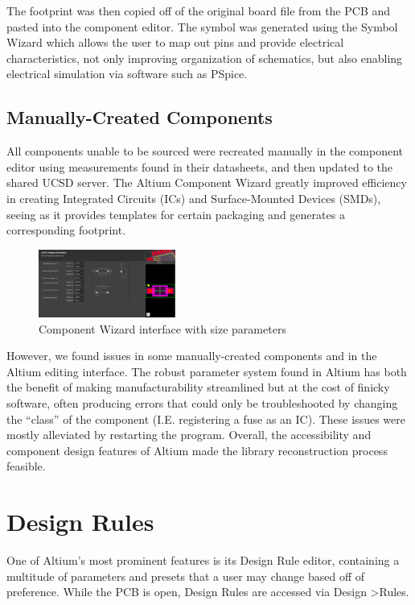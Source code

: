 \documentclass[twocolumn]{article}
\begin{document}
The footprint was then copied off of the original board file from the PCB and pasted into the component editor. The symbol was generated using the Symbol Wizard which allows the user to map out pins and provide electrical characteristics, not only improving organization of schematics, but also enabling electrical simulation via software such as PSpice.

\subsection{Manually-Created Components}
All components unable to be sourced were recreated manually in the component editor using measurements found in their datasheets, and then updated to the shared UCSD server. The Altium Component Wizard greatly improved efficiency in creating Integrated Circuits (ICs) and Surface-Mounted Devices (SMDs), seeing as it provides templates for certain packaging and generates a corresponding footprint. 

\begin{figure}[h]
    \centering
    \includegraphics[width=0.4\textwidth]{component wizard.png}
    \caption{Component Wizard interface with size parameters}
    \label{fig:component-wizard}
\end{figure}

However, we found issues in some manually-created components and in the Altium editing interface. The robust parameter system found in Altium has both the benefit of making manufacturability streamlined but at the cost of finicky software, often producing errors that could only be troubleshooted by changing the “class” of the component (I.E. registering a fuse as an IC). These issues were mostly alleviated by restarting the program. Overall, the accessibility and component design features of Altium made the library reconstruction process feasible.

\section{Design Rules}

One of Altium's most prominent features is its Design Rule editor, containing a multitude of parameters and presets that a user may change based off of preference. While the PCB is open, Design Rules are accessed via Design \textgreater Rules.
\end{document}
